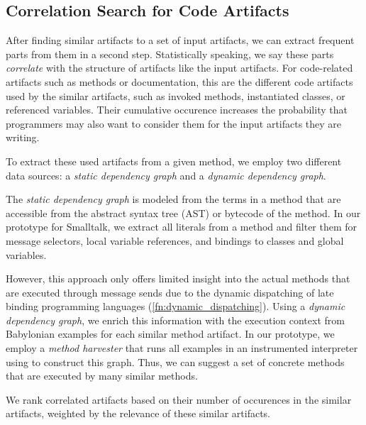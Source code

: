 \subsection{Correlation Search for Code Artifacts}
\label{sec:suggestions/search/correlations}

After finding similar artifacts to a set of input artifacts, we can extract frequent parts from them in a second step.
Statistically speaking, we say these parts \emph{correlate} with the structure of artifacts like the input artifacts.
For code-related artifacts such as methods or documentation, this are the different code artifacts used by the similar artifacts, such as invoked methods, instantiated classes, or referenced variables.
Their cumulative occurence increases the probability that programmers may also want to consider them for the input artifacts they are writing.

To extract these used artifacts from a given method, we employ two different data sources: a \emph{static dependency graph} and a \emph{dynamic dependency graph}.

The \emph{static dependency graph} is modeled from the terms in a method that are accessible from the abstract syntax tree (AST) or bytecode of the method.
In our prototype for Smalltalk, we extract all literals from a method and filter them for message selectors, local variable references, and bindings to classes and global variables.

However, this approach only offers limited insight into the actual methods that are executed through message sends due to the dynamic dispatching of late binding programming languages (\cref{fn:dynamic_dispatching}).
Using a \emph{dynamic dependency graph}, we enrich this information with the execution context from Babylonian examples for each similar method artifact.
In our prototype, we employ a \emph{method harvester} that runs all examples in an instrumented interpreter using  to construct this graph.
Thus, we can suggest a set of concrete methods that are executed by many similar methods.

We rank correlated artifacts based on their number of occurences in the similar artifacts, weighted by the relevance of these similar artifacts.


